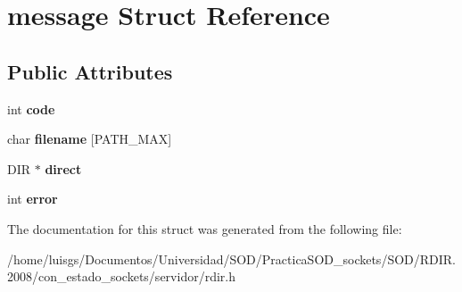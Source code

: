 \hypertarget{structmessage}{
\section{message Struct Reference}
\label{structmessage}
}
\subsection*{Public Attributes}
\begin{DoxyCompactItemize}
\item 
\hypertarget{structmessage_af12833636060660b9a317e3c018f4c93}{
int {\bfseries code}}
\label{structmessage_af12833636060660b9a317e3c018f4c93}

\item 
\hypertarget{structmessage_a9abc84247f064635cdfafa2bf557e3b9}{
char {\bfseries filename} \mbox{[}PATH\_\-MAX\mbox{]}}
\label{structmessage_a9abc84247f064635cdfafa2bf557e3b9}

\item 
\hypertarget{structmessage_aec59f1161ed9ab90bbab7a1fd282014a}{
DIR $\ast$ {\bfseries direct}}
\label{structmessage_aec59f1161ed9ab90bbab7a1fd282014a}

\item 
\hypertarget{structmessage_ac1a513a448332828e26580b7d3fd4966}{
int {\bfseries error}}
\label{structmessage_ac1a513a448332828e26580b7d3fd4966}

\end{DoxyCompactItemize}


The documentation for this struct was generated from the following file:\begin{DoxyCompactItemize}
\item 
/home/luisgs/Documentos/Universidad/SOD/PracticaSOD\_\-sockets/SOD/RDIR.2008/con\_\-estado\_\-sockets/servidor/rdir.h\end{DoxyCompactItemize}
